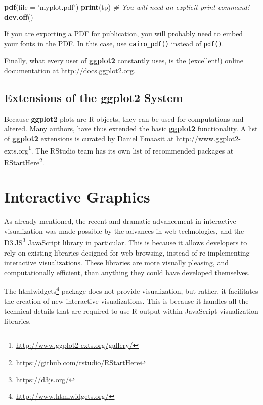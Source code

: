 \documentclass[]{book}
\newenvironment{Shaded}{\begin{snugshade}}{\end{snugshade}}
\newcommand{\CommentTok}[1]{\textcolor[rgb]{0.56,0.35,0.01}{\textit{#1}}}
\newcommand{\DataTypeTok}[1]{\textcolor[rgb]{0.13,0.29,0.53}{#1}}
\newcommand{\KeywordTok}[1]{\textcolor[rgb]{0.13,0.29,0.53}{\textbf{#1}}}
\newcommand{\NormalTok}[1]{#1}
\newcommand{\StringTok}[1]{\textcolor[rgb]{0.31,0.60,0.02}{#1}}
\renewcommand{\href}[2]{#2\footnote{\url{#1}}}
\theoremstyle{definition}
\theoremstyle{definition}
\theoremstyle{definition}
\theoremstyle{remark}
\let\BeginKnitrBlock\begin \let\EndKnitrBlock\end
\begin{document}
\begin{Shaded}
\begin{Highlighting}[]
\KeywordTok{pdf}\NormalTok{(}\DataTypeTok{file =} \StringTok{'myplot.pdf'}\NormalTok{)}
\KeywordTok{print}\NormalTok{(tp) }\CommentTok{# You will need an explicit print command!}
\KeywordTok{dev.off}\NormalTok{()}
\end{Highlighting}
\end{Shaded}

\BeginKnitrBlock{remark}
{}If you are exporting a PDF for publication, you will probably need to embed your fonts in the PDF.
In this case, use \texttt{cairo\_pdf()} instead of \texttt{pdf()}.
\EndKnitrBlock{remark}

Finally, what every user of \textbf{ggplot2} constantly uses, is the (excellent!) online documentation at \url{http://docs.ggplot2.org}.

\hypertarget{extensions-of-the-ggplot2-system}{%
\subsection{Extensions of the ggplot2 System}\label{extensions-of-the-ggplot2-system}}

Because \textbf{ggplot2} plots are R objects, they can be used for computations and altered.
Many authors, have thus extended the basic \textbf{ggplot2} functionality.
A list of \textbf{ggplot2} extensions is curated by Daniel Emaasit at \href{http://www.ggplot2-exts.org/gallery/}{http://www.ggplot2-exts.org}.
The RStudio team has its own list of recommended packages at \href{https://github.com/rstudio/RStartHere}{RStartHere}.

\hypertarget{interactive-graphics}{%
\section{Interactive Graphics}\label{interactive-graphics}}

As already mentioned, the recent and dramatic advancement in interactive visualization was made possible by the advances in web technologies, and the \href{https://d3js.org/}{D3.JS} JavaScript library in particular.
This is because it allows developers to rely on existing libraries designed for web browsing, instead of re-implementing interactive visualizations.
These libraries are more visually pleasing, and computationally efficient, than anything they could have developed themselves.

The \href{http://www.htmlwidgets.org/}{htmlwidgets} package does not provide visualization, but rather, it facilitates the creation of new interactive visualizations.
This is because it handles all the technical details that are required to use R output within JavaScript visualization libraries.
\end{document}
